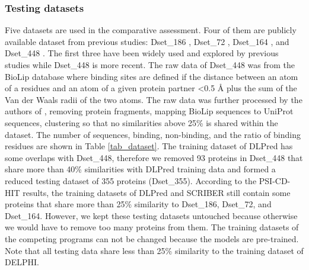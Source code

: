 \documentclass{bioinfo}
\begin{document}
\begin{methods}
\subsubsection{Testing datasets}\label{testing_data}
Five datasets are used in the comparative assessment. Four of them are publicly available dataset from previous studies: Dset\_186 \citep{murakami2010applying}, Dset\_72 \citep{hwang2008protein}, Dset\_164 \citep{dhole2014sequence}, and Dset\_448 \citep{zhang2019scriber}. The first three have been widely used and explored by previous studies while Dset\_448 is more recent. The raw data of Dset\_448 was from the BioLip database \citep{yang2012biolip} where binding sites are defined if the distance between an atom of a residues and an atom of a given protein partner <0.5 \AA{} plus the sum of the Van der Waals radii of the two atoms. The raw data was further processed by the authors of \citep{zhang2019scriber}, removing protein fragments, mapping BioLip sequences to UniProt sequences, clustering so that no similarities above 25\% is shared within the dataset. The number of sequences, binding, non-binding, and the ratio of binding residues are shown in Table \ref{tab_dataset}. The training dataset of DLPred has some overlaps with Dset\_448, therefore we removed 93 proteins in Dset\_448 that share more than 40\% similarities with DLPred training data and formed a reduced testing dataset of 355 proteins (Dset\_355).  According to the PSI-CD-HIT results, the training datasets of DLPred and SCRIBER still contain some proteins that share more than 25\% similarity to Dset\_186,  Dset\_72, and Dset\_164. However, we kept these testing datasets untouched because otherwise we would have to remove too many proteins from them. The training datasets of the competing programs can not be changed because the models are pre-trained. Note that all testing data share less than 25\% similarity to the training dataset of DELPHI. 


\end{methods}
\end{document}
